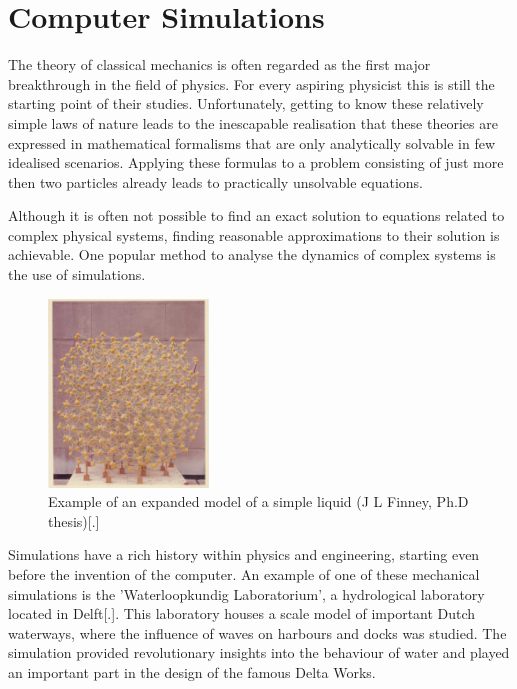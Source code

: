 \section{Computer Simulations}

The theory of classical mechanics is often regarded as the first major breakthrough in
the field of physics. For every aspiring physicist this is still the starting point of
their studies. Unfortunately, getting to know these relatively simple laws of nature
leads to the inescapable realisation that these theories are expressed in mathematical
formalisms that are only analytically solvable in few idealised scenarios. Applying these
formulas to a problem consisting of just more then two particles already leads to
practically unsolvable equations.

Although it is often not possible to find an exact solution to equations
related to complex physical systems, finding reasonable approximations to their solution
is achievable. One popular method to analyse the dynamics of complex systems is the use
of simulations.

\begin{figure}
    \vspace{-1cm}
  \begin{center}
    \includegraphics[width=0.38\textwidth]{Figures/WaterModel.png}
  \end{center}
  \caption{Example of an expanded model of a simple liquid (J L Finney, Ph.D thesis)[.]}
\end{figure}

Simulations have a rich history within physics and engineering, starting even before the
invention of the computer. An example of one of these mechanical simulations is the
'Waterloopkundig Laboratorium', a hydrological laboratory located in Delft[.]. This
laboratory houses a scale model of important Dutch waterways, where the influence of
waves on harbours and docks was studied.  The simulation provided revolutionary insights
into the behaviour of water and played an important part in the design of the famous
Delta Works.

